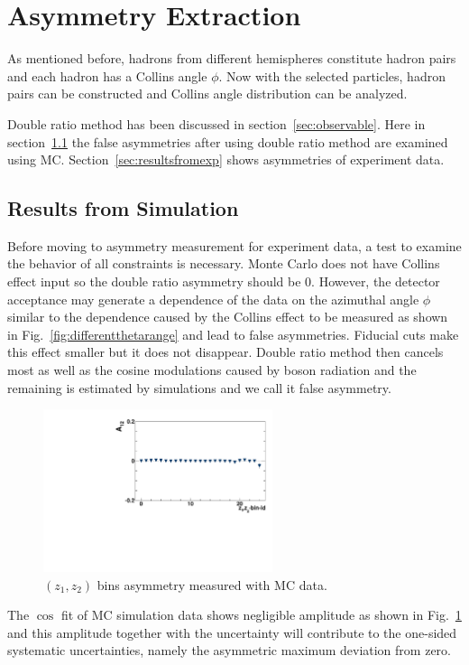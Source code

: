 \section{Asymmetry Extraction}
As mentioned before, hadrons from different hemispheres constitute hadron pairs and each hadron has a Collins angle $\phi$. Now with the selected particles, hadron pairs can be constructed and Collins angle distribution can be analyzed. %

Double ratio method has been discussed in section~\ref{sec:observable}. Here in section~\ref{sec:resutlsfrommc} the false asymmetries after using double ratio method are examined using MC. Section~\ref{sec:resultsfromexp} shows asymmetries of experiment data. 

\subsection{Results from Simulation}
\label{sec:resutlsfrommc}
Before moving to asymmetry measurement for experiment data, a test to examine the behavior of all constraints is necessary. Monte Carlo does not have Collins effect input so the double ratio asymmetry should be 0. However, the detector acceptance may generate a dependence of the data on the azimuthal angle $\phi$ similar to the dependence caused by the Collins effect to be measured as shown in Fig.~\ref{fig:differentthetarange} and lead to false asymmetries. Fiducial cuts make this effect smaller but it does not disappear. Double ratio method then cancels most as well as the cosine modulations caused by boson radiation and the remaining is estimated by simulations and we call it false asymmetry.
\begin{figure}[H]
    \centering
    \includegraphics[width=0.6\textwidth,natwidth=250,natheight=100]{figure_asy/ComZ_Phi12_pi0.pdf}
    \caption{$(z_1,z_{2})$ bins asymmetry measured with MC data.}
    \label{fig:mc_example}
\end{figure}
The $\cos$ fit of MC simulation data shows negligible amplitude as shown in Fig.~\ref{fig:mc_example} and this amplitude together with the uncertainty will contribute to the one-sided systematic uncertainties, namely the asymmetric maximum deviation from zero.   

